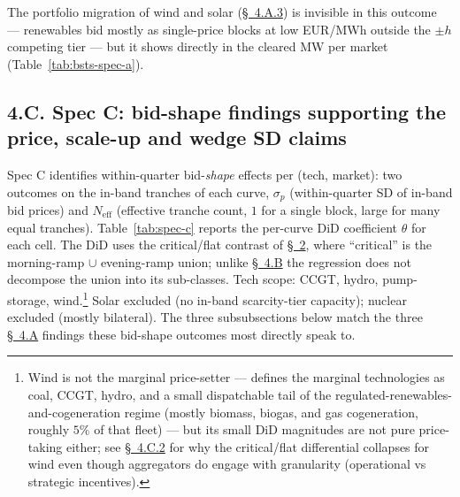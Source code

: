 \documentclass[11pt]{article}
\begin{document}
The portfolio migration of wind and solar (\hyperref[sec:4-renewable]{\S~4.A.3}) is invisible in this outcome --- renewables bid mostly as single-price blocks at low EUR/MWh outside the $\pm h$ competing tier --- but it shows directly in the cleared MW per market (Table~\ref{tab:bsts-spec-a}).

\vspace{10pt}

\subsection*{4.C. Spec C: bid-shape findings supporting the price, scale-up and wedge SD claims}
\label{sec:4-specC}
Spec C identifies within-quarter bid-\emph{shape} effects per (tech, market): two outcomes on the in-band tranches of each curve, $\sigma_p$ (within-quarter SD of in-band bid prices) and $N_{\text{eff}}$ (effective tranche count, $1$ for a single block, large for many equal tranches). Table~\ref{tab:spec-c} reports the per-curve DiD coefficient $\theta$ for each cell. The DiD uses the critical/flat contrast of \hyperref[sec:partition]{\S~2}, where ``critical'' is the morning-ramp $\cup$ evening-ramp union; unlike \hyperref[sec:4-specB]{\S~4.B} the regression does not decompose the union into its sub-classes. Tech scope: CCGT, hydro, pump-storage, wind.\footnote{Wind is not the marginal price-setter --- \citet{cnmc_supervision_2025} defines the marginal technologies as coal, CCGT, hydro, and a small dispatchable tail of the regulated-renewables-and-cogeneration regime (mostly biomass, biogas, and gas cogeneration, roughly $5\%$ of that fleet) --- but its small DiD magnitudes are not pure price-taking either; see \hyperref[sec:4-c-id15-ida]{\S~4.C.2} for why the critical/flat differential collapses for wind even though aggregators do engage with granularity (operational vs strategic incentives).} Solar excluded (no in-band scarcity-tier capacity); nuclear excluded (mostly bilateral). The three subsubsections below match the three \hyperref[sec:4-specA]{\S~4.A} findings these bid-shape outcomes most directly speak to.
\end{document}
